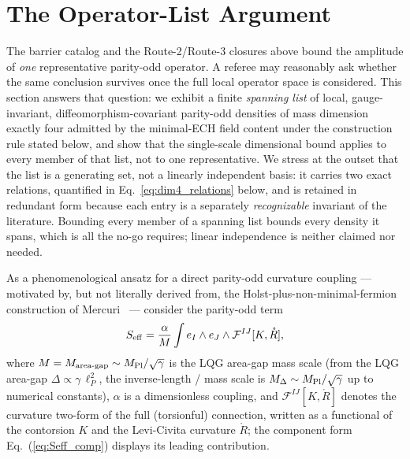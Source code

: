 \documentclass[aps,prd,twocolumn,superscriptaddress,showpacs,preprintnumbers,nofootinbib,longbibliography,floatfix]{revtex4-2}
\newcommand{\MPl}{M_{\rm Pl}}
\begin{document}
\section{The Operator-List Argument}\label{sec:completeness}

The barrier catalog and the Route-2/Route-3 closures above bound the
amplitude of \emph{one} representative parity-odd operator. A referee may
reasonably ask whether the same conclusion survives once the full local
operator space is considered. This section answers that question: we
exhibit a finite \emph{spanning list} of local, gauge-invariant,
diffeomorphism-covariant
parity-odd densities of mass dimension exactly four admitted by the
minimal-ECH field content under the construction rule stated below, and show
that the single-scale dimensional bound applies to every member of that
list, not to one representative. We stress at the outset that the list is
a generating set, not a linearly independent basis: it carries two exact
relations, quantified in Eq.~\eqref{eq:dim4_relations} below, and is
retained in redundant form because each entry is a separately
\emph{recognizable} invariant of the literature. Bounding every member of
a spanning list bounds every density it spans, which is all the no-go
requires; linear independence is neither claimed nor needed.

As a phenomenological ansatz for a direct parity-odd curvature coupling ---
motivated by, but not literally derived from, the Holst-plus-non-minimal-fermion
construction of Mercuri~\cite{Mercuri2009} --- consider the parity-odd term
\begin{equation}\label{eq:Seff}
S_{\rm eff} = \frac{\alpha}{M}\int e_I\wedge e_J\wedge \mathcal{F}^{IJ}[K,\mathring{R}],
\end{equation}
where $M = M_{\rm area\text{-}gap}\sim\MPl/\sqrt{\gamma}$ is the LQG area-gap
mass scale (from the LQG area-gap $\Delta \propto \gamma\,\ell_P^2$, the
inverse-length / mass scale is $M_\Delta \sim M_{\rm Pl}/\sqrt{\gamma}$ up
to numerical constants), $\alpha$ is a dimensionless coupling, and
$\mathcal{F}^{IJ}[K,\mathring{R}]$ denotes the curvature two-form of the
full (torsionful) connection, written as a functional of the contorsion
$K$ and the Levi-Civita curvature $\mathring{R}$; the component form
Eq.~(\ref{eq:Seff_comp}) displays its leading contribution.
\end{document}
